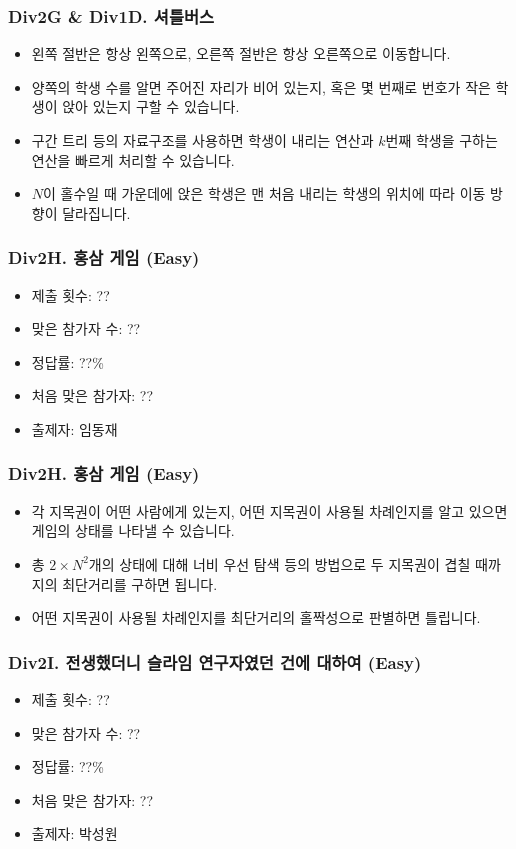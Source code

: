\documentclass[xetex]{beamer}
\begin{document}
\begin{frame}
  \frametitle{Div2G \& Div1D. 셔틀버스}
  \begin{itemize}
    \item 왼쪽 절반은 항상 왼쪽으로, 오른쪽 절반은 항상 오른쪽으로 이동합니다.
    \item 양쪽의 학생 수를 알면 주어진 자리가 비어 있는지, 혹은 몇 번째로 번호가 작은 학생이 앉아 있는지 구할 수 있습니다.
    \item 구간 트리 등의 자료구조를 사용하면 학생이 내리는 연산과 $k$번째 학생을 구하는 연산을 빠르게 처리할 수 있습니다.
    \item $N$이 홀수일 때 가운데에 앉은 학생은 맨 처음 내리는 학생의 위치에 따라 이동 방향이 달라집니다.
  \end{itemize}
\end{frame}

\begin{frame}
  \frametitle{Div2H. 홍삼 게임 (Easy)}
  \begin{itemize}
    \item 제출 횟수: ??
    \item 맞은 참가자 수: ??
    \item 정답률: ??\%
    \item 처음 맞은 참가자: ??
    \item 출제자: 임동재
  \end{itemize}
\end{frame}

\begin{frame}
  \frametitle{Div2H. 홍삼 게임 (Easy)}
  \begin{itemize}
    \item 각 지목권이 어떤 사람에게 있는지, 어떤 지목권이 사용될 차례인지를 알고 있으면 게임의 상태를 나타낼 수 있습니다.
    \item 총 $2 \times N^{2}$개의 상태에 대해 너비 우선 탐색 등의 방법으로 두 지목권이 겹칠 때까지의 최단거리를 구하면 됩니다.
    \item 어떤 지목권이 사용될 차례인지를 최단거리의 홀짝성으로 판별하면 틀립니다.
  \end{itemize}
\end{frame}

\begin{frame}
  \frametitle{Div2I. 전생했더니 슬라임 연구자였던 건에 대하여 (Easy)}
  \begin{itemize}
    \item 제출 횟수: ??
    \item 맞은 참가자 수: ??
    \item 정답률: ??\%
    \item 처음 맞은 참가자: ??
    \item 출제자: 박성원
  \end{itemize}
\end{frame}
\end{document}
